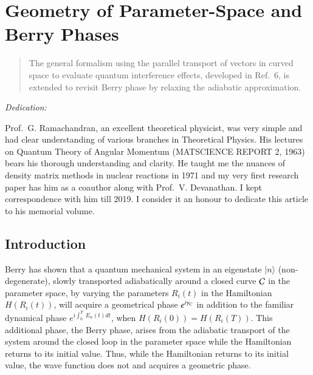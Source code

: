 \chapter[Geometry of Parameter-Space and Berry Phases]{Geometry of Parameter-Space and Berry Phases}\label{chap11}



\begin{abstract}
The general formalism using the parallel transport of vectors in curved space to evaluate quantum interference effects,  developed in Ref.\ 6, is extended to revisit Berry phase by relaxing the adiabatic approximation. 
\end{abstract}
\bigskip

\centerline{\textit{Dedication:}}
\smallskip

Prof.\ G. Ramachandran, an excellent theoretical physicist, was very simple and had clear understanding of  various branches in Theoretical Physics. His lectures on Quantum Theory of Angular Momentum  (MATSCIENCE REPORT 2, 1963) bears his  thorough understanding and clarity. He taught me the nuances of density matrix methods in nuclear  reactions in 1971 and my very first research paper has him as a coauthor along with Prof.\ V. Devanathan. I kept correspondence with him till 2019. I consider it an honour to dedicate this  article to his memorial volume.

\section{Introduction}\label{chap11-sec1}

Berry \cite{chap11-key1} has shown that a quantum mechanical system in an eigenstate $|n\rangle$ (non-degenerate), slowly transported  adiabatically around a closed curve ${\cal{C}}$ in the parameter space, by varying the parameters $R_i(t)$ in the  Hamiltonian $H(R_i(t))$, will acquire a geometrical phase $e^{i{\gamma}_{\cal{C}}}$ in addition to the familiar dynamical  phase $e^{i\int_0^T\ E_n(t)dt}$, when $H(R_i(0))=H(R_i(T))$. This additional phase, the Berry phase, arises from the  adiabatic transport of the system around the closed loop in the parameter space while the Hamiltonian returns to its  initial value. Thus, while the Hamiltonian returns to its initial value, the wave function does not and  acquires a geometric phase. 

